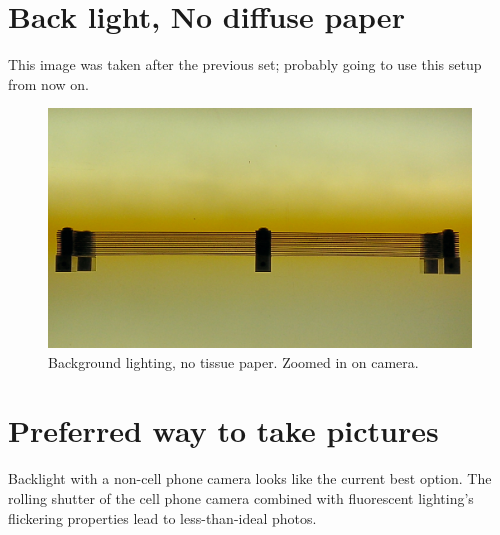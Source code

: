 \documentclass[10pt]{scrartcl}
\begin{document}

\clearpage
\section{Back light, No diffuse paper} %
\label{sec:no_diffuse_paper}
This image was taken after the previous set; probably going to use this setup from now on.

\begin{figure}[!ht]
    \centering
    \includegraphics[width=.9\textwidth]{../plots_tables_images/slats/IMAG0147.jpg}    
    \caption{Background lighting, no tissue paper. Zoomed in on camera.}
    \label{flowchart}
\end{figure}



\section{Preferred way to take pictures} %
\label{sec:preferred_way_to_take_pics}
Backlight with a non-cell phone camera looks like the current best option. The rolling shutter of the cell phone camera combined with fluorescent lighting's flickering properties lead to less-than-ideal photos.
\end{document}

